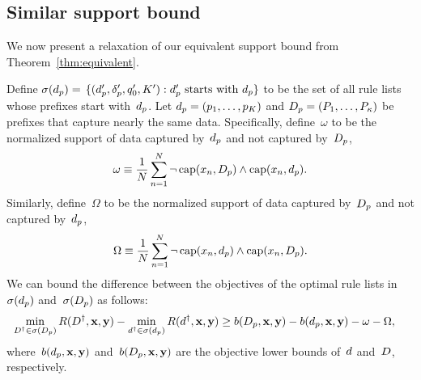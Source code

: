 \subsection{Similar support bound}
\label{sec:similar}

We now present a relaxation of our equivalent support bound
from Theorem~\ref{thm:equivalent}.

\begin{theorem}
\label{thm:similar}
Define ${\sigma(d_p) = }$
${\{(d_p', \delta_p', q_0', K') : d_p' \textnormal{ starts with } d_p \}}$
to be the set of all rule lists whose prefixes start with~$d_p$.
%
Let ${d_p = (p_1, \dots, p_K)}$ and
${D_p = (P_1, \dots, P_{\kappa})}$ be prefixes
that capture nearly the same data.
%
Specifically, define~$\omega$ to be the normalized support
of data captured by~$d_p$ and not captured by~$D_p$, \ie
\begin{align}
\omega \equiv \frac{1}{N} \sum_{n=1}^N
  \neg\, \Cap(x_n, \PrefixB)
  \wedge \Cap(x_n, \Prefix). %
\label{eq:omega}
\end{align}
%
Similarly, define~$\Omega$ to be the normalized support
of data captured by~$D_p$ and not captured by~$d_p$, \ie
\begin{align}
\Omega \equiv \frac{1}{N} \sum_{n=1}^N
  \neg\, \Cap(x_n, \Prefix)
  \wedge \Cap(x_n, \PrefixB). %
\label{eq:big-omega}
\end{align}
We can bound the difference between the objectives of the
optimal rule lists in~$\sigma(d_p)$
and~$\sigma(D_p)$ as follows:
\begin{align}
\min_{\RLB^\dagger \in \StartsWith(\PrefixB)} \Obj(\RLB^\dagger, \x, \y)
- \min_{\RL^\dagger \in \StartsWith(\Prefix)} \Obj(\RL^\dagger, \x, \y)
&\ge b(\PrefixB, \x, \y) - b(\Prefix, \x, \y) - \omega - \Omega,
\label{eq:similar}
\end{align}
where~$b(d_p, \mathbf{x}, \mathbf{y})$ and~$b(D_p, \mathbf{x}, \mathbf{y})$ are the
objective lower bounds of~${d}$ and~${D}$, respectively.
\end{theorem}

